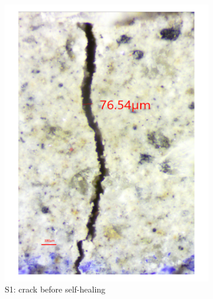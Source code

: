 \documentclass[11pt]{article}
\begin{document}
	
	\begin{figure}[!h]
	\centering
	\begin{subfigure}{0.3\textwidth}
		\centering
		\includegraphics[width = \linewidth]{crack11}
		\caption{S1: crack before self-healing}
	\end{subfigure}
	\hspace{1em}
	\begin{subfigure}{0.3\textwidth}
		\centering

\end{subfigure}
\end{figure}
\end{document}
